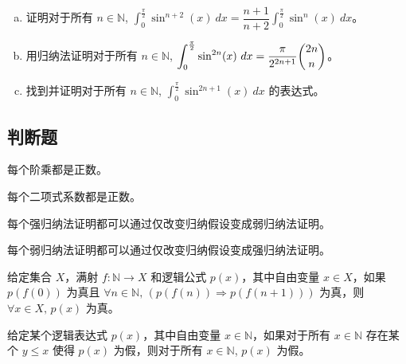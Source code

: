 \begin{chapex}
\label{cqCalculusEnd}
\begin{enumerate}[(a)]
\item 证明对于所有 $n \in \mathbb{N}$, $\displaystyle \int_0^{\frac{\pi}{2}} \sin^{n+2}(x)~dx = \dfrac{n+1}{n+2} \int_0^{\frac{\pi}{2}} \sin^n(x)~dx$。
\item 用归纳法证明对于所有 $n \in \mathbb{N}$, $\displaystyle \int_0^{\frac{\pi}{2}} \sin^{2n}(x)~dx = \dfrac{\pi}{2^{2n+1}} \dbinom{2n}{n}$。
\item 找到并证明对于所有 $n \in \mathbb{N}$, $\displaystyle \int_0^{\frac{\pi}{2}} \sin^{2n+1}(x)~dx$ 的表达式。
\end{enumerate}
\end{chapex}

\subsection*{判断题}


\begin{chapex} %
\label{cqInductionTFBegin}
每个阶乘都是正数。
\end{chapex}

\begin{chapex} %
每个二项式系数都是正数。
\end{chapex}

\begin{chapex} %
每个强归纳法证明都可以通过仅改变归纳假设变成弱归纳法证明。
\end{chapex}

\begin{chapex} %
每个弱归纳法证明都可以通过仅改变归纳假设变成强归纳法证明。
\end{chapex}

\begin{chapex} %
给定集合 $X$，满射 $f : \mathbb{N} \to X$ 和逻辑公式 $p(x)$，其中自由变量 $x \in X$，如果 $p(f(0))$ 为真且 $\forall n \in \mathbb{N},\, (p(f(n)) \Rightarrow p(f(n+1)))$ 为真，则 $\forall x \in X,\, p(x)$ 为真。
\end{chapex}

\begin{chapex} %
给定某个逻辑表达式 $p(x)$，其中自由变量 $x \in \mathbb{N}$，如果对于所有 $x \in \mathbb{N}$ 存在某个 $y \le x$ 使得 $p(x)$ 为假，则对于所有 $x \in \mathbb{N}$, $p(x)$ 为假。
\end{chapex}

